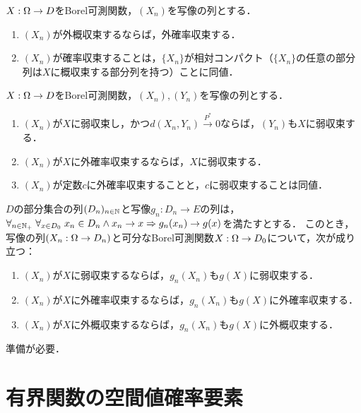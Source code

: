 \documentclass[uplatex,dvipdfmx]{jsreport}
\begin{document}
\begin{lemma}
    $X:\Omega\to D$をBorel可測関数，$(X_n)$を写像の列とする．
    \begin{enumerate}
        \item $(X_n)$が外概収束するならば，外確率収束する．
        \item $(X_n)$が確率収束することは，$\{X_n\}$が相対コンパクト（$\{X_n\}$の任意の部分列は$X$に概収束する部分列を持つ）ことに同値．
    \end{enumerate}
\end{lemma}

\begin{lemma}\label{lemma-確率収束と弱収束}
    $X:\Omega\to D$をBorel可測関数，$(X_n),(Y_n)$を写像の列とする．
    \begin{enumerate}
        \item $(X_n)$が$X$に弱収束し，かつ$d(X_n,Y_n)\xrightarrow{P^*}0$ならば，$(Y_n)$も$X$に弱収束する．
        \item $(X_n)$が$X$に外確率収束するならば，$X$に弱収束する．
        \item $(X_n)$が定数$c$に外確率収束することと，$c$に弱収束することは同値．
    \end{enumerate}
\end{lemma}

\begin{theorem}[連続写像定理の拡張]
    $D$の部分集合の列$(D_n)_{n\in\mathbb{N}}$と写像$g_n:D_n\to E$の列は，$\forall_{n\in\mathbb{N}_+}\;\forall_{x\in D_0}\;x_n\in D_n\land x_n\to x\Rightarrow g_n(x_n)\to g(x)$を満たすとする．
    このとき，写像の列$(X_n:\Omega\to D_n)$と可分なBorel可測関数$X:\Omega\to D_0$について，次が成り立つ：
    \begin{enumerate}
        \item $(X_n)$が$X$に弱収束するならば，$g_n(X_n)$も$g(X)$に弱収束する．
        \item $(X_n)$が$X$に外確率収束するならば，$g_n(X_n)$も$g(X)$に外確率収束する．
        \item $(X_n)$が$X$に外概収束するならば，$g_n(X_n)$も$g(X)$に外概収束する．
    \end{enumerate}
\end{theorem}
\begin{remarks}
    準備が必要．
\end{remarks}

\section{有界関数の空間値確率要素}
\end{document}
